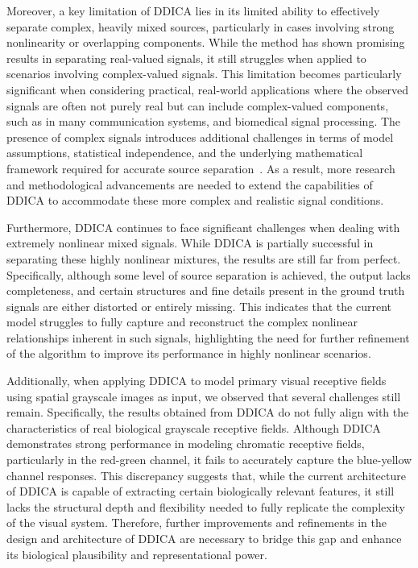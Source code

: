 \documentclass{article}
\begin{document}
Moreover, a key limitation of DDICA lies in its limited ability to effectively separate complex, heavily mixed sources, particularly in cases involving strong nonlinearity or overlapping components. While the method has shown promising results in separating real-valued signals, it still struggles when applied to scenarios involving complex-valued signals. This limitation becomes particularly significant when considering practical, real-world applications where the observed signals are often not purely real but can include complex-valued components, such as in many communication systems, and biomedical signal processing. The presence of complex signals introduces additional challenges in terms of model assumptions, statistical independence, and the underlying mathematical framework required for accurate source separation~\cite{Aapo23PATTERN,Novey2008ComplexICA}. As a result, more research and methodological advancements are needed to extend the capabilities of DDICA to accommodate these more complex and realistic signal conditions.

Furthermore, DDICA continues to face significant challenges when dealing with extremely nonlinear mixed signals. While DDICA is partially successful in separating these highly nonlinear mixtures, the results are still far from perfect. Specifically, although some level of source separation is achieved, the output lacks completeness, and certain structures and fine details present in the ground truth signals are either distorted or entirely missing. This indicates that the current model struggles to fully capture and reconstruct the complex nonlinear relationships inherent in such signals, highlighting the need for further refinement of the algorithm to improve its performance in highly nonlinear scenarios.

Additionally, when applying DDICA to model primary visual receptive fields using spatial grayscale images as input, we observed that several challenges still remain. Specifically, the results obtained from DDICA do not fully align with the characteristics of real biological grayscale receptive fields. Although DDICA demonstrates strong performance in modeling chromatic receptive fields, particularly in the red-green channel, it fails to accurately capture the blue-yellow channel responses. This discrepancy suggests that, while the current architecture of DDICA is capable of extracting certain biologically relevant features, it still lacks the structural depth and flexibility needed to fully replicate the complexity of the visual system. Therefore, further improvements and refinements in the design and architecture of DDICA are necessary to bridge this gap and enhance its biological plausibility and representational power.
\end{document}
